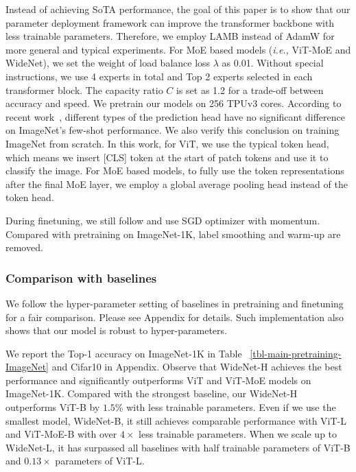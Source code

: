 \documentclass[letterpaper]{article} %
\newcommand{\ie}{\emph{i.e.,}\xspace}
\begin{document}
Instead of achieving SoTA performance, the goal of this paper is to show that our parameter deployment framework can improve the transformer backbone with less trainable parameters. Therefore, we employ LAMB instead of AdamW for more general and typical experiments. For MoE based models (\ie ViT-MoE and WideNet), we set the weight of load balance loss $\lambda$ as 0.01. Without special instructions, we use 4 experts in total and Top 2 experts selected in each transformer block. The capacity ratio $C$ is set as 1.2 for a trade-off between accuracy and speed. We pretrain our models on 256 TPUv3 cores. According to recent work~\citep{zhai2021scaling}, different types of the prediction head have no significant difference on ImageNet's few-shot performance. We also verify this conclusion on training ImageNet from scratch. In this work, for ViT, we use the typical token head, which means we insert [CLS] token at the start of patch tokens and use it to classify the image. For MoE based models, to fully use the token representations after the final MoE layer, we employ a global average pooling head instead of the token head. 

During finetuning, we still follow \cite{dosovitskiy2020image} and use SGD optimizer with momentum. Compared with pretraining on ImageNet-1K, label smoothing and warm-up are removed. 







\subsubsection{Comparison with baselines}



We follow the hyper-parameter setting of baselines in pretraining and finetuning for a fair comparison. Please see Appendix for details. Such implementation also shows that our model is robust to hyper-parameters. 












We report the Top-1 accuracy on ImageNet-1K in Table ~\ref{tbl-main-pretraining-ImageNet} and Cifar10 in Appendix. Observe that WideNet-H achieves the best performance and significantly outperforms ViT and ViT-MoE models on ImageNet-1K. Compared with the strongest baseline, our WideNet-H outperforms ViT-B by $1.5\%$ with less trainable parameters. Even if we use the smallest model, WideNet-B, it still achieves comparable performance with ViT-L and ViT-MoE-B with over $4 \times$ less trainable parameters. When we scale up to WideNet-L, it has surpassed all baselines with half trainable parameters of ViT-B and $0.13 \times$ parameters of ViT-L. 
\end{document}
